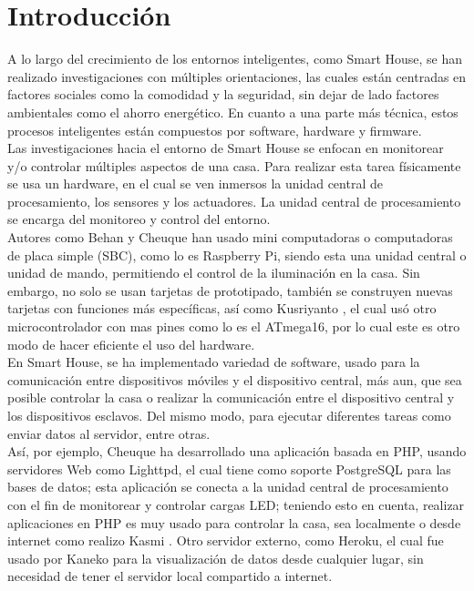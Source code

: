 \chapter{Introducción}


A lo largo del crecimiento de los entornos inteligentes, como Smart House, se han realizado investigaciones con múltiples orientaciones, las cuales están centradas en factores sociales como la comodidad y la seguridad, sin dejar de lado factores ambientales como el ahorro energético. En cuanto a una parte más técnica, estos procesos inteligentes están compuestos por software, hardware y firmware.\\

Las investigaciones hacia el entorno de Smart House se enfocan en monitorear y/o controlar múltiples aspectos de una casa. Para realizar esta tarea físicamente se usa un hardware, en el cual se ven inmersos la unidad central de procesamiento, los sensores y los actuadores. La unidad central de procesamiento se encarga del monitoreo y control del entorno.\\

Autores como Behan \cite{Behan2013} y Cheuque \cite{Cheuque2015} han usado mini computadoras o computadoras de placa simple (SBC), como lo es Raspberry Pi,  siendo esta una unidad central o unidad de mando, permitiendo el control de la iluminación en la casa. Sin embargo, no solo se usan tarjetas de prototipado, también se construyen nuevas tarjetas con funciones más específicas, así como Kusriyanto \cite{Kusriyanto2015}, el cual usó otro microcontrolador con mas pines como lo es el ATmega16, por lo cual este es otro modo de hacer eficiente el uso del hardware.\\

En Smart House, se ha implementado variedad de software, usado para la comunicación entre dispositivos móviles y el dispositivo central, más aun, que sea posible controlar la casa o realizar la comunicación entre el dispositivo central y los dispositivos esclavos. Del mismo modo, para ejecutar diferentes tareas como enviar datos al servidor, entre otras.\\

Así, por ejemplo, Cheuque \cite{Cheuque2015} ha desarrollado una aplicación basada en PHP, usando servidores Web como Lighttpd, el cual tiene como soporte PostgreSQL para las bases de datos; esta aplicación se conecta a la unidad central de procesamiento con el fin de monitorear y controlar cargas LED; teniendo esto en cuenta, realizar aplicaciones en PHP es muy usado para controlar la casa, sea localmente o desde internet como realizo Kasmi \cite{Kasmi2016}. Otro servidor externo, como Heroku, el cual fue usado por Kaneko \cite{Kaneko2017} para la visualización de datos desde cualquier lugar, sin necesidad de tener el servidor local compartido a internet.\\

